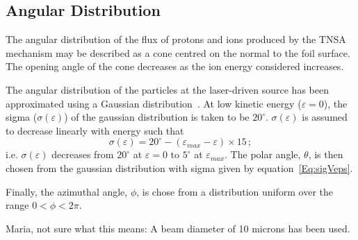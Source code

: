 \subsection{Angular Distribution}

The angular distribution of the flux of protons and ions produced by
the TNSA mechanism may be described as a cone centred on the normal to
the foil surface.
The opening angle of the cone decreases as the ion energy considered
increases.

The angular distribution of the particles at the laser-driven source
has been approximated using a Gaussian
distribution~\cite{10.1038/s41598-019-41705-0}.  
At low kinetic energy ($\varepsilon = 0$), the sigma
($\sigma(\varepsilon)$) of the gaussian distribution is taken to be
$20^\circ$.
$\sigma(\varepsilon)$ is assumed to decrease linearly with energy such
that
\begin{equation}
  \sigma(\varepsilon) = 20^\circ - (\varepsilon_{max}
                           - \varepsilon)\times15 \, ;
  \label{Eq:sigVeps}
\end{equation}
i.e. $\sigma(\varepsilon)$ decreases from $20^\circ$ at
$\varepsilon=0$ to $5^\circ$ at $\varepsilon_{max}$.
The polar angle, $\theta$, is then chosen from the gaussian
distribution with sigma given by equation~\ref{Eq:sigVeps}.

Finally, the azimuthal angle, $\phi$, is chose from a distribution
uniform over the range $0 < \phi < 2\pi$.

{\color{red} Maria, not sure what this means: A beam diameter of 10
microns has been used.}
